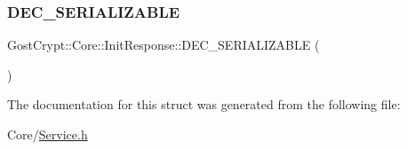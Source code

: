\subsubsection{\texorpdfstring{D\+E\+C\+\_\+\+S\+E\+R\+I\+A\+L\+I\+Z\+A\+B\+LE}{DEC\_SERIALIZABLE}}
{\footnotesize\ttfamily Gost\+Crypt\+::\+Core\+::\+Init\+Response\+::\+D\+E\+C\+\_\+\+S\+E\+R\+I\+A\+L\+I\+Z\+A\+B\+LE (\begin{DoxyParamCaption}\item[{\hyperlink{struct_gost_crypt_1_1_core_1_1_init_response}{Init\+Response}}]{ }\end{DoxyParamCaption})\hspace{0.3cm}{\ttfamily [signal]}}



The documentation for this struct was generated from the following file\+:\begin{DoxyCompactItemize}
\item 
Core/\hyperlink{_service_8h}{Service.\+h}\end{DoxyCompactItemize}

